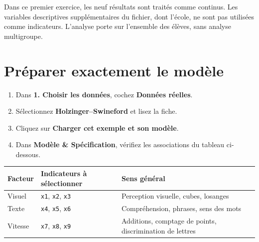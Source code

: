 \documentclass[
  french,
  11pt,
  a4paper,
  DIV=11,
  numbers=noendperiod]{scrreprt}
\newcounter{none} %
\providecommand{\tightlist}{%
  \setlength{\itemsep}{0pt}\setlength{\parskip}{0pt}}
\begin{document}
Dans ce premier exercice, les neuf résultats sont traités comme
continus. Les variables descriptives supplémentaires du fichier, dont
l'école, ne sont pas utilisées comme indicateurs. L'analyse porte sur
l'ensemble des élèves, sans analyse multigroupe.

\section{Préparer exactement le
modèle}\label{pruxe9parer-exactement-le-moduxe8le}

\begin{enumerate}
\def\labelenumi{\arabic{enumi}.}
\tightlist
\item
  Dans \textbf{1. Choisir les données}, cochez \textbf{Données réelles}.
\item
  Sélectionnez \textbf{Holzinger--Swineford} et lisez la fiche.
\item
  Cliquez sur \textbf{Charger cet exemple et son modèle}.
\item
  Dans \textbf{Modèle \& Spécification}, vérifiez les associations du
  tableau ci-dessous.
\end{enumerate}


{\def\LTcaptype{none} %
\begin{longtable}[]{@{}
  >{\raggedright\arraybackslash}p{}
  >{\raggedright\arraybackslash}p{}
  >{\raggedright\arraybackslash}p{}@{}}
\toprule\noalign{}
\begin{minipage}[b]{\linewidth}\raggedright
Facteur
\end{minipage} & \begin{minipage}[b]{\linewidth}\raggedright
Indicateurs à sélectionner
\end{minipage} & \begin{minipage}[b]{\linewidth}\raggedright
Sens général
\end{minipage} \\
\midrule\noalign{}
\endhead
\bottomrule\noalign{}
\endlastfoot
Visuel & \texttt{x1}, \texttt{x2}, \texttt{x3} & Perception visuelle,
cubes, losanges \\
Texte & \texttt{x4}, \texttt{x5}, \texttt{x6} & Compréhension, phrases,
sens des mots \\
Vitesse & \texttt{x7}, \texttt{x8}, \texttt{x9} & Additions, comptage de
points, discrimination de lettres \\
\end{longtable}
}
\end{document}
